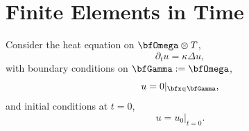 \chapter{Finite Elements in Time}\label{cha:finite elements in time}
    \line
    
    \begin{example}
        Consider the heat equation on $\bfOmega\otimes T$,
        \begin{equation}\label{eqn:FEs in time PDE}
            \partial_{t}u  =  \kappa\Delta u,
        \end{equation}
        with boundary conditions on $\bfGamma  :=  \bfOmega$,
        \begin{equation}\label{eqn:FEs in time BC}
            u  =  0|_{\bfx \in \bfGamma},
        \end{equation}
        and initial conditions at $t  =  0$,
        \begin{equation}\label{eqn:FEs in time IC}
            u  =  u_{0}|_{t = 0}.
        \end{equation}
        

\end{example}
